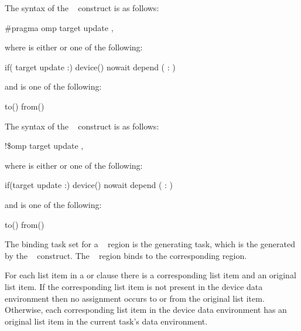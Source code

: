 {{{\syntax
\ccppspecificstart
The syntax of the ~ construct is as follows:

\begin{boxedcode}
\#pragma omp target update \plc{clause[ [ [},\plc{] clause] ... ] new-line}
\end{boxedcode}
where  is either  or one of the following:

\begin{indentedcodelist}
if(\plc{[} target update :\plc{] scalar-expression})
device()
nowait
depend ( : )
\end{indentedcodelist}

and  is one of the following:

\begin{indentedcodelist}
to()
from()
\end{indentedcodelist}
\ccppspecificend

\fortranspecificstart
The syntax of the ~ construct is as follows:

\begin{boxedcode}
!\$omp target update \plc{clause[ [ [},\plc{] clause] ... ]}
\end{boxedcode}

where  is either  or one of the following:

\begin{indentedcodelist}
if(\plc{[}target update :\plc{] scalar-logical-expression})
device()
nowait
depend ( : )
\end{indentedcodelist}

and  is one of the following:

\begin{indentedcodelist}
to()
from()
\end{indentedcodelist}
\fortranspecificend

\begin{samepage}

\binding
The binding task set for a ~ region is the
generating task, which is the  generated
by the ~ construct. The ~
region binds to the corresponding  region.

\descr
For each list item in a  or  clause there is a corresponding list item and an 
original list item. If the corresponding list item is not present in the device data environment then no assignment occurs to or from the original list item. Otherwise, each corresponding list item in the 
device data environment has an original list item in the current task's data environment.


\end{samepage}}}}
